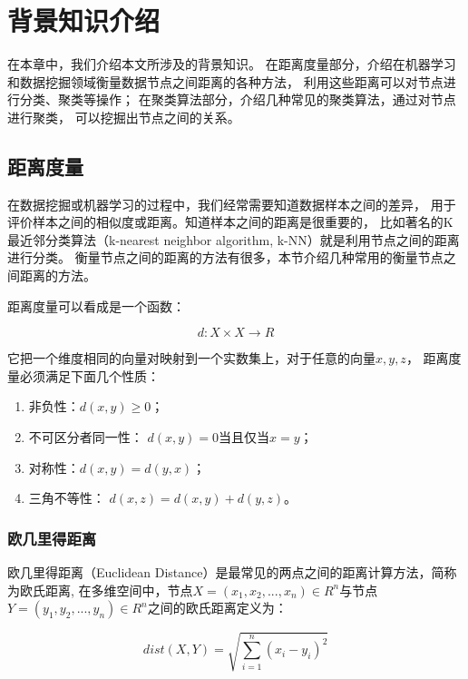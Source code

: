 \chapter{背景知识介绍}
\label{chap:back}

在本章中，我们介绍本文所涉及的背景知识。
在距离度量部分，介绍在机器学习和数据挖掘领域衡量数据节点之间距离的各种方法，
利用这些距离可以对节点进行分类、聚类等操作；
在聚类算法部分，介绍几种常见的聚类算法，通过对节点进行聚类，
可以挖掘出节点之间的关系。

\section{距离度量}
\label{sec:distance-metric}

在数据挖掘或机器学习的过程中，我们经常需要知道数据样本之间的差异，
用于评价样本之间的相似度或距离。知道样本之间的距离是很重要的，
比如著名的K最近邻分类算法（k-nearest neighbor algorithm, k-NN）就是利用节点之间的距离进行分类。
衡量节点之间的距离的方法有很多，本节介绍几种常用的衡量节点之间距离的方法。

距离度量可以看成是一个函数：

$$
d : X \times X \rightarrow R
$$

它把一个维度相同的向量对映射到一个实数集上，对于任意的向量$x, y, z$，
距离度量必须满足下面几个性质：

\begin{enumerate}
    \item 非负性：$ d(x, y) \geq 0 $；
    \item 不可区分者同一性： $ d(x, y) = 0$当且仅当$ x = y$；
    \item 对称性：$ d(x, y) = d(y, x)$；
    \item 三角不等性： $ d(x, z) = d(x, y) + d(y, z) $。
\end{enumerate}

\subsection{欧几里得距离}

欧几里得距离（Euclidean Distance）是最常见的两点之间的距离计算方法，简称为欧氏距离,
在多维空间中，节点$X = (x_1, x_2, ..., x_n) \in R ^ n$与节点$Y = (y_1, y_2, ..., y_n) \in R ^ n$之间的欧氏距离定义为：

\begin{equation}
    dist(X, Y) = \sqrt{ \sum_{i=1}^{n} (x_i - y_i)^2}
\end{equation}

